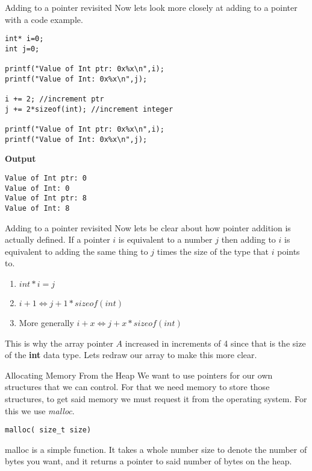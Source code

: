 \documentclass[10pt]{beamer}
\begin{document}
\begin{frame}[fragile]{Adding to a pointer revisited}
Now lets look more closely at adding to a pointer with a code example.

\begin{verbatim}
int* i=0;
int j=0;

printf("Value of Int ptr: 0x%x\n",i);
printf("Value of Int: 0x%x\n",j);

i += 2; //increment ptr
j += 2*sizeof(int); //increment integer

printf("Value of Int ptr: 0x%x\n",i);
printf("Value of Int: 0x%x\n",j);
\end{verbatim}
{\bf Output}
\begin{verbatim}
Value of Int ptr: 0
Value of Int: 0
Value of Int ptr: 8
Value of Int: 8
\end{verbatim}
\end{frame}

\begin{frame}[fragile]{Adding to a pointer revisited}
Now lets be clear about how pointer addition is actually defined. If a pointer $i$ is equivalent to a number $j$ then adding to $i$ is equivalent to adding the same thing to $j$ times the size of the type that $i$ points to.

\begin{enumerate}
	\item $int* i = j$
	\item $i + 1 \iff j + 1 * sizeof(int)$
	\item More generally $i + x \iff j + x * sizeof(int)$
\end{enumerate}
This is why the array pointer $A$ increased in increments of 4 since that is the size of the {\bf int} data type. Lets redraw our array to make this more clear.
\end{frame}

\begin{frame}[fragile]{Allocating Memory From the Heap}
We want to use pointers for our own structures that we can control. For that we need memory to store those structures, to get said memory we must request it from the operating system. For this we use {\it malloc}.
\begin{verbatim}
malloc( size_t size)
\end{verbatim}
malloc is a simple function. It takes a whole number size to denote the number of bytes you want, and it returns a pointer to said number of bytes on the heap.
\end{frame}
\end{document}
